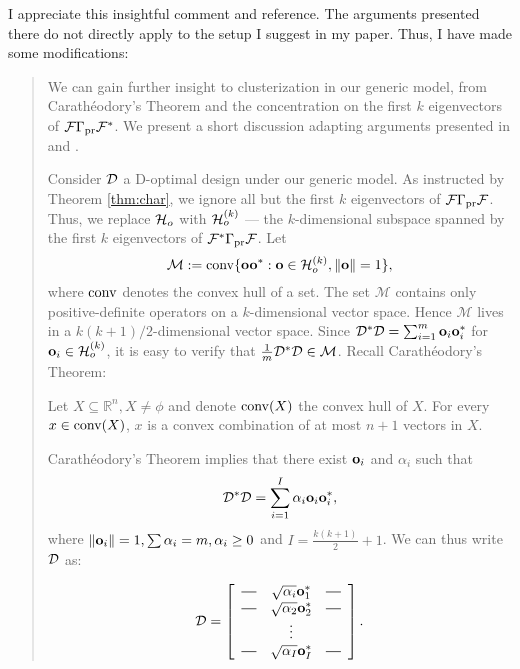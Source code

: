 \AR I appreciate this insightful comment and reference. The arguments
presented there do not directly apply to the setup I suggest in my
paper. Thus, I have made some modifications:

\begin{quote} %
  We can gain further insight to clusterization in our generic model,
  from Carath\'eodory's Theorem and the concentration on the first $k$
  eigenvectors of $\mathcal{F} \Gamma_{\textup{pr}} \mathcal{F}^*$. We present a short discussion
  adapting arguments presented in \cite[Chapter 3]{silvey1980} and
  \cite[Section 5.2.3]{pronzatoPazman2013}.

  Consider $\mathcal{D}$ a D-optimal design under our generic model.  As
  instructed by Theorem \ref{thm:char}, we ignore all but the first
  $k$ eigenvectors of $\mathcal{F} \Gamma_{\textup{pr}} \mathcal{F}$. Thus, we replace $\mathcal{H}_o$
  with $\mathcal{H}_o^{(k)}$ --- the $k$-dimensional subspace spanned by the
  first $k$ eigenvectors of $\mathcal{F}^*\Gamma_{\textup{pr}}\mathcal{F}$. Let
  \begin{equation*}
    \mathcal{M} := \operatorname*{conv} \{\mathbf{o} \mathbf{o}^* : \mathbf{o}\in \mathcal{H}_o^{(k)}, \|\mathbf{o}\|=1\},
  \end{equation*}
  where $\operatorname*{conv}$ denotes the convex hull of a set. The set
  $\mathcal{M}$ contains only positive-definite operators on a
  $k$-dimensional vector space. Hence $\mathcal{M}$ lives in a
  $k(k+1)/2$-dimensional vector space. Since $\mathcal{D}^*\mathcal{D} =
  \sum_{i=1}^m \mathbf{o}_i\mathbf{o}_i^*$ for $\mathbf{o}_i \in \mathcal{H}_o^{(k)}$, it is
  easy to verify that $\frac1m \mathcal{D}^*\mathcal{D} \in \mathcal{M}$.  Recall
  Carath\'eodory's Theorem:
  \begin{theorem*}
    Let $X \subseteq \mathbb{R}^n, X \neq \phi$ and denote $\operatorname*{conv} (X)$
    the convex hull of $X$. For every $x \in \operatorname*{conv} (X)$, $x$ is a convex
    combination of at most $n+1$ vectors in $X$.
  \end{theorem*}
  Carath\'eodory's Theorem implies that there exist $\mathbf{o}_i$ and
  $\alpha_i$ such that
  \begin{equation*}
    \mathcal{D}^*\mathcal{D} = \sum_{i=1}^I \alpha_i \mathbf{o}_i\mathbf{o}_i^*,
  \end{equation*}
  where $\|\mathbf{o}_i\|=1, \sum\alpha_i = m, \alpha_i \geq 0$ and $I =
  \frac{k(k+1)}{2} + 1$. We can thus write $\mathcal{D}$ as:
  
  \[
  \opt =
  \left[
    \begin{array}{ccc}
      \horzbar & \sqrt{\alpha_i} \meas^*_1 & \horzbar \\
      \horzbar & \sqrt{\alpha_2} \meas_2^* & \horzbar \\
      & \vdots    &          \\
      \horzbar & \sqrt{\alpha_I} \meas_I^* & \horzbar \\
    \end{array}
    \right].
  \]
  

\end{quote}

